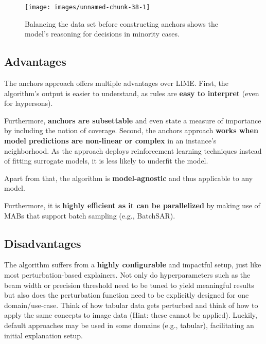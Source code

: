 \documentclass[
  12pt,
]{krantz}
\begin{document}
\begin{figure}

{\centering \texttt{[image: images/unnamed-chunk-38-1]} 

}

\caption{Balancing the data set before constructing anchors shows the model's reasoning for decisions in minority cases.}\label{fig:unnamed-chunk-38}
\end{figure}

\hypertarget{advantages-15}{%
\subsection{Advantages}\label{advantages-15}}

The anchors approach offers multiple advantages over LIME. First, the algorithm's output is easier to understand, as rules are \textbf{easy to interpret} (even for laypersons).

Furthermore, \textbf{anchors are subsettable} and even state a measure of importance by including the notion of coverage. Second, the anchors approach \textbf{works when model predictions are non-linear or complex} in an instance's neighborhood. As the approach deploys reinforcement learning techniques instead of fitting surrogate models, it is less likely to underfit the model.

Apart from that, the algorithm is \textbf{model-agnostic} and thus applicable to any model.

Furthermore, it is \textbf{highly efficient as it can be parallelized} by making use of MABs that support batch sampling (e.g., BatchSAR).

\hypertarget{disadvantages-15}{%
\subsection{Disadvantages}\label{disadvantages-15}}

The algorithm suffers from a \textbf{highly configurable} and impactful setup, just like most perturbation-based explainers. Not only do hyperparameters such as the beam width or precision threshold need to be tuned to yield meaningful results but also does the perturbation function need to be explicitly designed for one domain/use-case. Think of how tabular data gets perturbed and think of how to apply the same concepts to image data (Hint: these cannot be applied). Luckily, default approaches may be used in some domains (e.g., tabular), facilitating an initial explanation setup.
\end{document}
